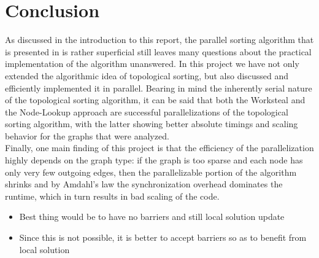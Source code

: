 \section{Conclusion}
%
As discussed in the introduction to this report, the parallel sorting algorithm that is presented in  \cite{er1983parallel} is rather superficial still leaves many questions about the practical implementation of the algorithm unanswered.
In this project we have not only extended the algorithmic idea of topological sorting, but also discussed and efficiently implemented it in parallel.
Bearing in mind the inherently serial nature of the topological sorting algorithm, it can be said that both the Worksteal and the Node-Lookup approach are successful parallelizations of the topological sorting algorithm, with the latter showing better absolute timings and scaling behavior for the graphs that were analyzed. \\
Finally, one main finding of this project is that the efficiency of the parallelization highly depends on the graph type: if the graph is too sparse and each node has only very few outgoing edges, then the parallelizable portion of the algorithm shrinks and by Amdahl's law the synchronization overhead dominates the runtime, which in turn results in bad scaling of the code. \\

\begin{invisible}
 \begin{itemize}
   \item Best thing would be to have no barriers and still local solution update
   \item Since this is not possible, it is better to accept barriers so as to benefit from local solution
 \end{itemize}
\end{invisible}
